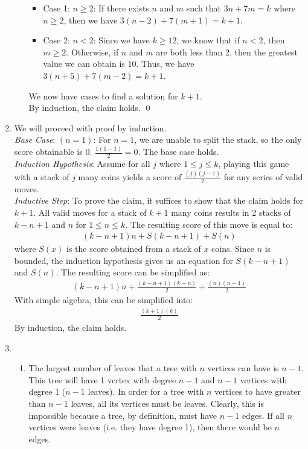 \documentclass[a4paper]{article}
\newcommand{\<}{\langle}
\renewcommand{\>}{\rangle}
\renewcommand{\^}{\wedge}
\begin{document}
\begin{enumerate}
\begin{enumerate}
\begin{itemize}
                \item Case 1: $n \geq 2$: If there exists $n$ and $m$ such that $3n + 7m = k$ where $n \geq 2$, then we have $3(n-2) + 7(m+1) = k+1$.
                \item Case 2: $n < 2$: Since we have $k \geq 12$, we know that if $n < 2$, then $m \geq 2$. Otherwise, if $n$ and $m$ are both less than 2, then the greatest value we can obtain is 10. Thus, we have $3(n+5) + 7(m-2) = k+1$.
            \end{itemize}
            We now have cases to find a solution for $k+1$.\\
            By induction, the claim holds. \qed
        \end{enumerate}
    \item
        We will proceed with proof by induction.\\
        \textit{Base Case}: $(n=1)$: For $n = 1$, we are unable to split the stack, so the only score obtainable is 0. $\frac{1(1-1)}{2} = 0$. The base case holds.\\
        \textit{Induction Hypothesis}: Assume for all $j$ where $1 \leq j \leq k$, playing this game with a stack of $j$ many coins yields a score of $\frac{(j)(j-1)}{2}$ for any series of valid moves.\\
        \textit{Inductive Step}: To prove the claim, it suffices to show that the claim holds for $k+1$. All valid moves for a stack of $k+1$ many coins results in 2 stacks of $k - n + 1$ and $n$ for $1 \leq n \leq k$. The resulting score of this move is equal to:
        \begin{align*}
            (k-n+1)n + S(k-n+1) + S(n)
        \end{align*}
        where $S(x)$ is the score obtained from a stack of $x$ coins. Since $n$ is bounded, the induction hypothesis gives us an equation for $S(k-n+1)$ and $S(n)$. The resulting score can be simplified as:
        \begin{align*}
            (k-n+1)n + \frac{(k-n+1)(k-n)}{2} + \frac{(n)(n-1)}{2}
        \end{align*}
        With simple algebra, this can be simplified into:
        \begin{align*}
            \frac{(k+1)(k)}{2}
        \end{align*}
        By induction, the claim holds.
    \item
        \begin{enumerate}
            \item The largest number of leaves that a tree with $n$ vertices can have is $n-1$. This tree will have 1 vertex with degree $n-1$ and $n-1$ vertices with degree 1 ($n-1$ leaves). In order for a tree with $n$ vertices to have greater than $n-1$ leaves, all its vertices must be leaves. Clearly, this is impossible because a tree, by definition, must have $n - 1$ edges. If all $n$ vertices were leaves (i.e. they have degree 1), then there would be $n$ edges.

\end{enumerate}
\end{enumerate}
\end{document}
